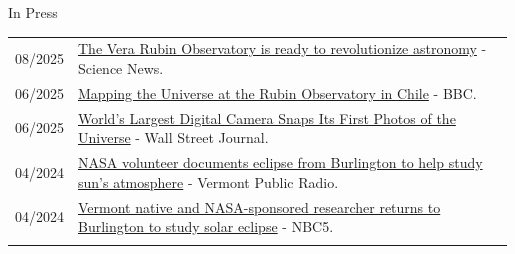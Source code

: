 \begin{rSection}{In Press}
\setlength{\extrarowheight}{3pt}
\begin{longtable}{p{0.1\linewidth}p{0.89\linewidth}}
    08/2025 & \href{https://www.sciencenews.org/article/vera-rubin-observatory-digital-camera}{The Vera Rubin Observatory is ready to revolutionize astronomy} - Science News. \\
    06/2025 & \href{https://www.youtube.com/watch?v=6RBZqhIgllI}{Mapping the Universe at the Rubin Observatory in Chile} - BBC. \\
    06/2025 & \href{https://www.wsj.com/science/space-astronomy/worlds-largest-digital-camera-snaps-its-first-photos-of-the-universe-68099904}{World’s Largest Digital Camera Snaps Its First Photos of the Universe} - Wall Street Journal. \\
    04/2024 & \href{https://www.vermontpublic.org/local-news/2024-04-10/nasa-volunteer-photo-eclipse-burlington-sun-atmosphere}{NASA volunteer documents eclipse from Burlington to help study sun's atmosphere} - Vermont Public Radio. \\
    04/2024 & \href{https://www.mynbc5.com/article/total-eclipse-nasa/60433342}{Vermont native and NASA-sponsored researcher returns to Burlington to study solar eclipse} - NBC5. \\
     &
\end{longtable}
\end{rSection}
